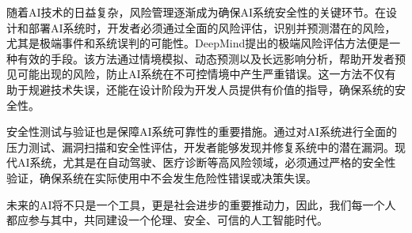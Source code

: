 随着AI技术的日益复杂，风险管理逐渐成为确保AI系统安全性的关键环节。在设计和部署AI系统时，开发者必须通过全面的风险评估，识别并预测潜在的风险，尤其是极端事件和系统误判的可能性。DeepMind提出的极端风险评估方法便是一种有效的手段。该方法通过情境模拟、动态预测以及长远影响分析，帮助开发者预见可能出现的风险，防止AI系统在不可控情境中产生严重错误。这一方法不仅有助于规避技术失误，还能在设计阶段为开发人员提供有价值的指导，确保系统的安全性。

安全性测试与验证也是保障AI系统可靠性的重要措施。通过对AI系统进行全面的压力测试、漏洞扫描和安全性评估，开发者能够发现并修复系统中的潜在漏洞。现代AI系统，尤其是在自动驾驶、医疗诊断等高风险领域，必须通过严格的安全性验证，确保系统在实际使用中不会发生危险性错误或决策失误。


未来的AI将不只是一个工具，更是社会进步的重要推动力，因此，我们每一个人都应参与其中，共同建设一个伦理、安全、可信的人工智能时代。




